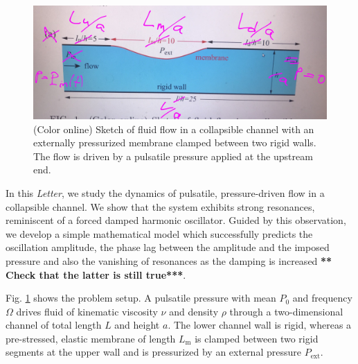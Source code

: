 \documentclass[aps,prl,reprint,superscriptaddress,floatfix]{revtex4-1}
\begin{document}

\begin{figure}
\includegraphics[width=1\linewidth]{matthias_sketches/fig1.jpg}
	\caption{\label{fig:setup}(Color online) Sketch of fluid
          flow in a collapsible channel with an externally pressurized
          membrane clamped between two rigid walls. The flow is driven
          by a pulsatile pressure applied at the upstream end.}
\end{figure}

In this \emph{Letter}, we study the dynamics of pulsatile,
pressure-driven flow in a collapsible channel. We show that the
system exhibits strong resonances, reminiscent of a
forced damped harmonic oscillator. Guided by this observation, we develop
a simple mathematical model which successfully predicts the
oscillation amplitude, the phase lag between the
amplitude and the imposed pressure and also the vanishing of resonances
as the damping is increased {\bf *** Check that the latter is still true***}.

Fig. \ref{fig:setup} shows the problem setup.
A pulsatile pressure with mean $P_0$ and frequency $\Omega$
drives fluid of kinematic viscosity $\nu$ and density $\rho$
through a two-dimensional channel of total length $L$ and height $a$.
The lower channel wall is rigid, whereas a pre-stressed, elastic
membrane of length $L_\text{m}$ is clamped
between two rigid segments at the upper wall and is pressurized by an external
pressure $P_\text{ext}$.
\end{document}
